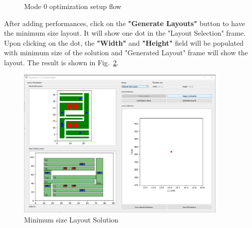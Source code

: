\documentclass[11pt]{article}
\begin{document}
\begin{itemize}
\begin{figure}[t]
    \caption{Mode 0 optimization setup flow}
    \label{opt_set_mode_0}
    \end{figure}
     After adding performances, click on the \textbf{"Generate Layouts"} button to have the minimum size layout. It will show one dot in the "Layout Selection" frame. Upon clicking on the dot, the \textbf{"Width"} and \textbf{"Height"} field will be populated with minimum size of the solution and "Generated Layout" frame will show the layout. The result is shown in Fig.~\ref{mode_0_sol}.
     
    \begin{figure}[H]
    \centering
    \includegraphics[width=0.9\textwidth, height=3.5 in]{./figs/Test/Mode_0_sol.PNG}
    \caption{Minimum size Layout Solution}
    \label{mode_0_sol}
    \end{figure}
    

\end{itemize}
\end{document}
